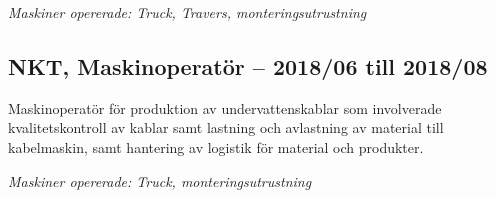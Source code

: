 \vspace{5pt}\textit{Maskiner opererade: Truck, Travers, monteringsutrustning}

\vspace{15pt} %
\subsection*{\textcolor{colorTitelErfarenhet}{NKT, Maskinoperatör – 2018/06 till 2018/08}}
Maskinoperatör för produktion av undervattenskablar som involverade kvalitetskontroll av kablar samt lastning och avlastning av material till kabelmaskin, samt hantering av logistik för material och produkter.

\vspace{5pt}\textit{Maskiner opererade: Truck, monteringsutrustning}
    
    \vspace{15pt} %
